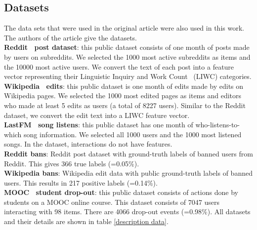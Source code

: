 \subsection*{Datasets}
 
The data sets that were used in the original article were also used in this work. The authors of the article give the datasets. \\

\textbf{Reddit~\cite{Reddit} post dataset}: this public dataset consists of one month of posts made by users on subreddits. We selected the 1000 most active subreddits as items and the 10000 most active users. We convert the text of each post into a feature vector representing their Linguistic Inquiry and Work Count~\cite{pennebaker01LIWC} (LIWC) categories.\\
\textbf{Wikipedia~\cite{Wiki} edits}: this public dataset is one month of edits made by edits on Wikipedia pages. We selected the 1000 most edited pages as items and editors who made at least 5 edits as users (a total of 8227 users). Similar to the Reddit dataset, we convert the edit text into a LIWC feature vector.\\
\textbf{LastFM~\cite{10.1007/978-3-642-33486-3_5lastFM} song listens}: this public dataset has one month of who-listens-to-which song information. We selected all 1000 users and the 1000 most listened songs. In the dataset, interactions do not have features.\\
\textbf{Reddit bans}: Reddit post dataset with ground-truth labels of banned users from Reddit. This gives 366 true labels (=0.05\%).\\
\textbf{Wikipedia bans}: Wikipedia edit data with public ground-truth labels of banned users. This results in 217 positive labels (=0.14\%).\\
\textbf{MOOC~\cite{mooc} student drop-out}: this public dataset consists of actions done by students on a MOOC online course. This dataset consists of 7047 users interacting with 98 items. There are 4066 drop-out events (=0.98\%). All datasets and their details are shown in table \ref{description data}. \\

